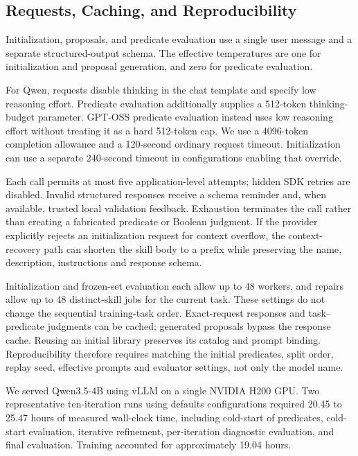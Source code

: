 \subsection{Requests, Caching, and Reproducibility}
\label{app:implementation-runtime}
Initialization, proposals, and predicate evaluation use a single user message and a separate structured-output schema. The effective temperatures are one for initialization and proposal generation, and zero for predicate evaluation.

For Qwen, requests disable thinking in the chat template and specify low reasoning effort. Predicate evaluation additionally supplies a 512-token thinking-budget parameter. GPT-OSS predicate evaluation instead uses low reasoning effort without treating it as a hard 512-token cap. We use a 4096-token completion allowance and a 120-second ordinary request timeout. Initialization can use a separate 240-second timeout in configurations enabling that override.

Each call permits at most five application-level attempts; hidden SDK retries are disabled. Invalid structured responses receive a schema reminder and, when available, trusted local validation feedback. Exhaustion terminates the call rather than creating a fabricated predicate or Boolean judgment. If the provider explicitly rejects an initialization request for context overflow, the context-recovery path can shorten the skill body to a prefix while preserving the name, description, instructions and response schema.

Initialization and frozen-set evaluation each allow up to 48 workers, and repairs allow up to 48 distinct-skill jobs for the current task. These settings do not change the sequential training-task order. Exact-request responses and task--predicate judgments can be cached; generated proposals bypass the response cache. Reusing an initial library preserves its catalog and prompt binding. Reproducibility therefore requires matching the initial predicates, split order, replay seed, effective prompts and evaluator settings, not only the model name.

We served Qwen3.5-4B using vLLM on a single NVIDIA H200 GPU. Two representative ten-iteration runs using defaults configurations required 20.45 to 25.47 hours of measured wall-clock time, including cold-start of predicates, cold-start evaluation, iterative refinement, per-iteration diagnostic evaluation, and final evaluation. Training accounted for approximately 19.04 hours.

